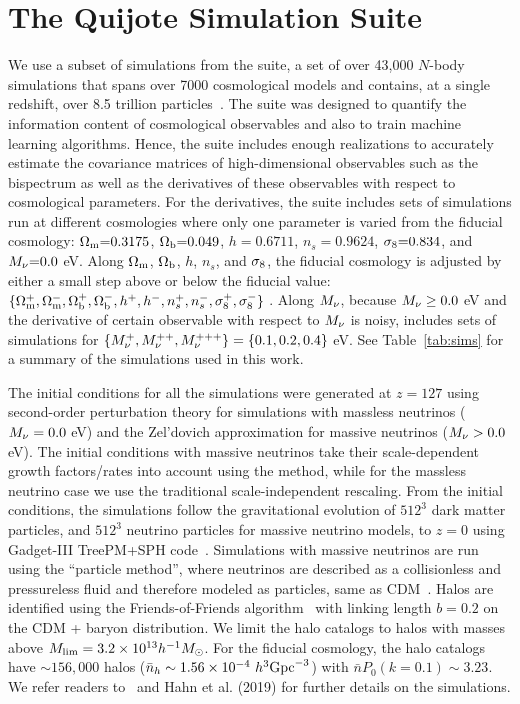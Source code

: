 \section{The Quijote Simulation Suite} \label{sec:sims}
We use a subset of simulations from the \quij suite, a set of over 43,000 $N$-body 
simulations that spans over 7000 cosmological models and contains, at a single 
redshift, over 8.5 trillion particles~\citep{villaescusa-navarro2019}. 
The \quij suite was designed to quantify the information content of cosmological 
observables and also to train machine learning algorithms. Hence, the suite 
includes enough realizations to accurately estimate the covariance matrices 
of high-dimensional observables such as the bispectrum as well as the derivatives 
of these observables with respect to cosmological parameters. For the derivatives, 
the suite includes sets of simulations run at different cosmologies where only 
one parameter is varied from the fiducial cosmology:
$\Omega_{\rm m}{=}0.3175$, $\Omega_{\rm b}{=}0.049$, $h{=}0.6711$, $n_s{=}0.9624$, $\sigma_8{=}0.834$, 
and $M_\nu{=}0.0$ eV. Along $\Omega_{\rm m}$, $\Omega_{\rm b}$, $h$, $n_s$, and $\sigma_8$, the fiducial 
cosmology is adjusted by either a small step above or below the fiducial value:
$\{\Omega_{\rm m}^{+}, \Omega_{\rm m}^{-}, \Omega_{\rm b}^{+}, \Omega_{\rm b}^{-}, h^+, h^-, n_s^{+}, n_s^{-}, \sigma_8^{+}, \sigma_8^-\}$ . 
Along $M_\nu$, because $M_\nu \ge 0.0$ eV and the derivative of certain observable 
with respect to $M_\nu$ is noisy, \quij includes sets of simulations for 
$\{M_\nu^{+}, M_\nu^{++}, M_\nu^{+++} \} = \{0.1, 0.2, 0.4\}$ eV. See 
Table~\ref{tab:sims} for a summary of the \quij simulations used in this work. 

The initial conditions for all the simulations were generated at $z=127$ using 
second-order perturbation theory for simulations with massless neutrinos 
($M_\nu = 0.0$ eV) and the Zel’dovich approximation for massive neutrinos 
($M_\nu > 0.0$ eV). The initial conditions with massive neutrinos take 
their scale-dependent growth factors/rates into account using the 
\cite{zennaro2017a} method, while for the massless neutrino case we use 
the traditional scale-independent rescaling. From the initial conditions, 
the simulations follow the gravitational evolution of $512^3$ dark matter
particles, and $512^3$ neutrino particles for massive neutrino models, to 
$z=0$ using {\sc Gadget-III} TreePM+SPH code~\citep{springel2005}. Simulations 
with massive neutrinos are run using the ``particle method'', where neutrinos 
are described as a collisionless and pressureless fluid and therefore modeled 
as particles, same as CDM~\citep{brandbyge2008,viel2010}. Halos are identified 
using the Friends-of-Friends algorithm~\citep[FoF;][]{davis1985} with linking
length $b=0.2$ on the CDM + baryon distribution. We limit the halo catalogs to 
halos with masses above $M_{\rm lim} = 3.2\times 10^{13} h^{-1}M_\odot$.
For the fiducial cosmology, the halo catalogs have ${\sim}156,000$ halos 
($\bar{n}_h \sim 1.56 \times 10^{-4}~h^3{\rm Gpc}^{-3}$) with $\bar{n} P_0(k=0.1)\sim 3.23$. 
We refer readers to~\cite{villaescusa-navarro2019} and 
Hahn et al. (2019) for further details on the \quij simulations.
